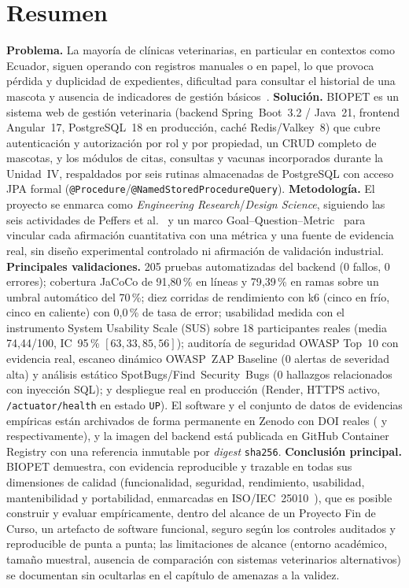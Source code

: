 \chapter*{Resumen}
\label{cap:resumen}

\textbf{Problema.} La mayor\'ia de cl\'inicas veterinarias, en particular en
contextos como Ecuador, siguen operando con registros manuales o en papel,
lo que provoca p\'erdida y duplicidad de expedientes, dificultad para
consultar el historial de una mascota y ausencia de indicadores de gesti\'on
b\'asicos~\cite{cedeno2021veterinaria}. \textbf{Soluci\'on.} BIOPET es un
sistema web de gesti\'on veterinaria (backend Spring~Boot~3.2 / Java~21,
frontend Angular~17, PostgreSQL~18 en producci\'on, cach\'e Redis/Valkey~8)
que cubre autenticaci\'on y autorizaci\'on por rol y por propiedad, un CRUD
completo de mascotas, y los m\'odulos de citas, consultas y vacunas
incorporados durante la Unidad~IV, respaldados por seis rutinas
almacenadas de PostgreSQL con acceso JPA formal
(\texttt{@Procedure}/\texttt{@NamedStoredProcedureQuery}).
\textbf{Metodolog\'ia.} El proyecto se enmarca como \emph{Engineering
Research}/\emph{Design Science}, siguiendo las seis actividades de Peffers
et al.~\cite{peffers2007dsrm} y un marco Goal--Question--Metric~\cite{vansolingen2002gqm}
para vincular cada afirmaci\'on cuantitativa con una m\'etrica y una fuente de
evidencia real, sin dise\~no experimental controlado ni afirmaci\'on de
validaci\'on industrial. \textbf{Principales validaciones.} 205 pruebas
automatizadas del backend (0 fallos, 0 errores); cobertura JaCoCo de
91{,}80\,\% en l\'ineas y 79{,}39\,\% en ramas sobre un umbral autom\'atico
del 70\,\%; diez corridas de rendimiento con k6 (cinco en fr\'io, cinco en
caliente) con 0{,}0\,\% de tasa de error; usabilidad medida con el
instrumento System Usability Scale (SUS) sobre 18 participantes reales
(media 74{,}44/100, IC~95\,\% $[63{,}33, 85{,}56]$); auditor\'ia de
seguridad OWASP Top~10 con evidencia real, escaneo din\'amico OWASP~ZAP
Baseline (0 alertas de severidad alta) y an\'alisis est\'atico
SpotBugs/Find~Security~Bugs (0 hallazgos relacionados con inyecci\'on SQL);
y despliegue real en producci\'on (Render, HTTPS activo,
\texttt{/actuator/health} en estado \texttt{UP}). El software y el conjunto
de datos de evidencias emp\'iricas est\'an archivados de forma permanente en
Zenodo con DOI reales (\texttt{\doisoftware} y \texttt{\doidataset}
respectivamente), y la imagen del backend est\'a publicada en GitHub
Container Registry con una referencia inmutable por \emph{digest}
\texttt{sha256}. \textbf{Conclusi\'on principal.} BIOPET demuestra, con
evidencia reproducible y trazable en todas sus dimensiones de calidad
(funcionalidad, seguridad, rendimiento, usabilidad, mantenibilidad y
portabilidad, enmarcadas en ISO/IEC~25010~\cite{iso25010-2011}), que es
posible construir y evaluar emp\'iricamente, dentro del alcance de un
Proyecto Fin de Curso, un artefacto de software funcional, seguro seg\'un
los controles auditados y reproducible de punta a punta; las limitaciones
de alcance (entorno acad\'emico, tama\~no muestral, ausencia de
comparaci\'on con sistemas veterinarios alternativos) se documentan sin
ocultarlas en el cap\'itulo de amenazas a la validez.

